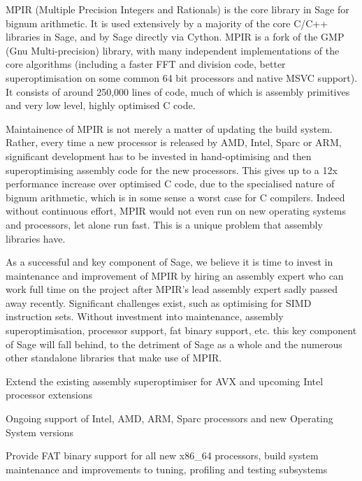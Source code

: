 \begin{workpackage}[id=hpc,wphases=36-48,
  title=High Performance Computing,
  PSRM=1, %
  LLRM=12, %
  SARM=1, %
  UKRM=1, %
  UBRM=1, %
  UJFRM=12]
\begin{tasklist}
\begin{task}[title=MPIR,id=hpc_singular]
MPIR (Multiple Precision Integers and Rationals) is the core library in Sage
for bignum arithmetic. It is used extensively by a majority of the core C/C++
libraries in Sage, and by Sage directly via Cython. MPIR is a fork of the 
GMP (Gnu Multi-precision) library, with many independent implementations of the
core algorithms (including a faster FFT and division code, better 
superoptimisation on some common 64 bit processors and native MSVC support). 
It consists of around 250,000 lines of code, much of which is assembly 
primitives and very low level, highly optimised C code.

Maintainence of MPIR is not merely a matter of updating the build system.
Rather, every time a new processor is released by AMD, Intel, Sparc or ARM,
significant development has to be invested in hand-optimising and then
superoptimising assembly code for the new processors. This gives up to a 12x
performance increase over optimised C code, due to the specialised nature of
bignum arithmetic, which is in some sense a worst case for C compilers. Indeed
without continuous effort, MPIR would not even run on new operating systems and
processors, let alone run fast. This is a unique problem that assembly libraries
have.

As a successful and key component of Sage, we believe it is time to invest in
maintenance and improvement of MPIR by hiring an assembly expert who can work
full time on the project after MPIR's lead assembly expert sadly passed
away recently. Significant challenges exist, such as
optimising for SIMD instruction sets. Without investment into maintenance,
assembly superoptimisation, processor support, fat binary support, etc. this key
component of Sage will fall behind, to the detriment of Sage as a whole and the
numerous other standalone libraries that make use of MPIR.
\end{task}
\end{tasklist}

\begin{wpdelivs}
  \begin{wpdeliv}[due=12,id=MPIRsuperoptimiser,dissem=??,nature=??]
      {Extend the existing assembly superoptimiser for AVX and upcoming Intel processor extensions}
\end{wpdeliv}
  \begin{wpdeliv}[due=24,id=MPIRprocessors,dissem=??,nature=??]
      {Ongoing support of Intel, AMD, ARM, Sparc processors and new Operating System versions}
\end{wpdeliv}
  \begin{wpdeliv}[due=12,id=MPIRfat,dissem=??,nature=??]
      {Provide FAT binary support for all new x86\_64 processors, build system maintenance and improvements to tuning, profiling and testing subsystems}
\end{wpdeliv}
\end{wpdelivs}



\end{workpackage}
